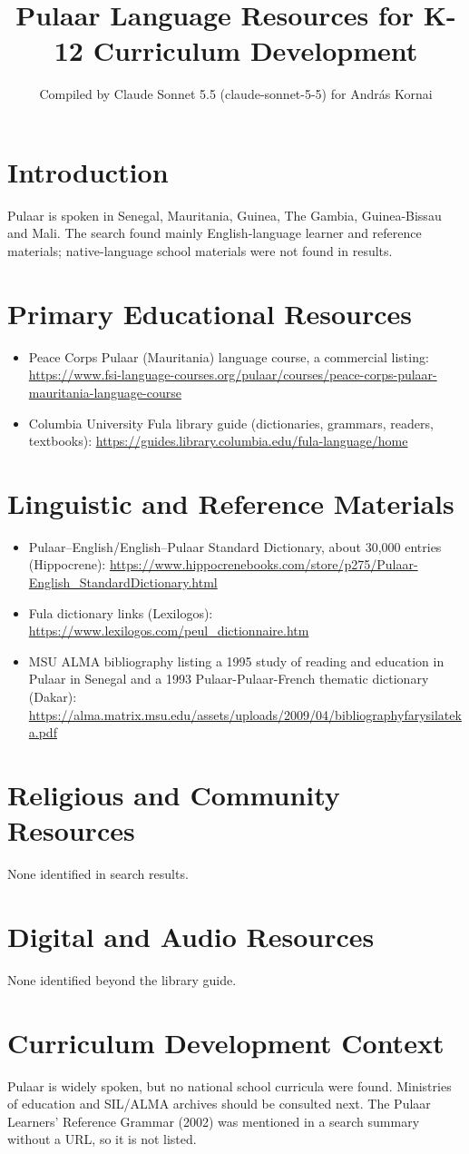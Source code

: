 \documentclass[12pt]{article}
\title{Pulaar Language Resources for K-12 Curriculum Development}
\author{Compiled by Claude Sonnet 5.5 (claude-sonnet-5-5) for Andr\'as Kornai}
\date{}
\begin{document}
\maketitle
\section{Introduction}
Pulaar is spoken in Senegal, Mauritania, Guinea, The Gambia, Guinea-Bissau and Mali. The search found mainly English-language learner and reference materials; native-language school materials were not found in results.
\section{Primary Educational Resources}
\begin{itemize}
\item Peace Corps Pulaar (Mauritania) language course, a commercial listing: \url{https://www.fsi-language-courses.org/pulaar/courses/peace-corps-pulaar-mauritania-language-course}
\item Columbia University Fula library guide (dictionaries, grammars, readers, textbooks): \url{https://guides.library.columbia.edu/fula-language/home}
\end{itemize}
\section{Linguistic and Reference Materials}
\begin{itemize}
\item Pulaar--English/English--Pulaar Standard Dictionary, about 30,000 entries (Hippocrene): \url{https://www.hippocrenebooks.com/store/p275/Pulaar-English_StandardDictionary.html}
\item Fula dictionary links (Lexilogos): \url{https://www.lexilogos.com/peul_dictionnaire.htm}
\item MSU ALMA bibliography listing a 1995 study of reading and education in Pulaar in Senegal and a 1993 Pulaar-Pulaar-French thematic dictionary (Dakar): \url{https://alma.matrix.msu.edu/assets/uploads/2009/04/bibliographyfarysilateka.pdf}
\end{itemize}
\section{Religious and Community Resources}
None identified in search results.
\section{Digital and Audio Resources}
None identified beyond the library guide.
\section{Curriculum Development Context}
Pulaar is widely spoken, but no national school curricula were found. Ministries of education and SIL/ALMA archives should be consulted next. The Pulaar Learners' Reference Grammar (2002) was mentioned in a search summary without a URL, so it is not listed.
\end{document}
